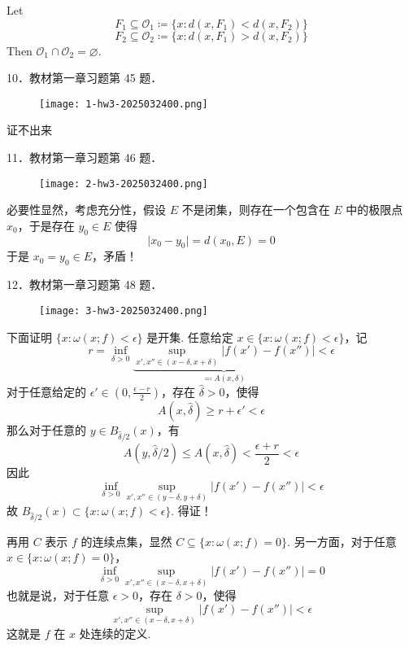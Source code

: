 Let
\[
F_1\subseteq \mathcal{O}_{1}\coloneqq \{ x:d(x,F_1)<d(x,F_2) \}
\]
\[
F_2\subseteq \mathcal{O}_{2}\coloneqq \{ x:d(x,F_1)>d(x,F_2) \}
\]
Then $\mathcal{O}_{1}\cap \mathcal{O}_{2}=\varnothing$.

\begin{exercise}
10．教材第一章习题第 45 题．
\begin{figure}[H]
\centering
\texttt{[image: 1-hw3-2025032400.png]}
\label{}
\end{figure}
\end{exercise}
证不出来

\begin{exercise}
11．教材第一章习题第 46 题．
\begin{figure}[H]
\centering
\texttt{[image: 2-hw3-2025032400.png]}
\label{}
\end{figure}
\end{exercise}
必要性显然，考虑充分性，假设 $E$ 不是闭集，则存在一个包含在 $E$ 中的极限点 $x_0$，于是存在 $y_0\in E$ 使得
\[
\lvert x_0-y_0 \rvert =d(x_0,E)=0
\]
于是 $x_0=y_0\in E$，矛盾！

\begin{exercise}
12．教材第一章习题第 48 题．
\begin{figure}[H]
\centering
\texttt{[image: 3-hw3-2025032400.png]}
\label{}
\end{figure}
\end{exercise}
下面证明 $\{ x:\omega(x;f)<\epsilon \}$ 是开集. 任意给定 $x\in \{x: \omega(x;f)<\epsilon \}$，记
\[
r=\inf_{\delta>0}\underbrace{ \sup_{x',x''\in(x-\delta,x+\delta)} \lvert f(x')-f(x'') \rvert }_{ \eqqcolon A(x,\delta) } <\epsilon
\]
对于任意给定的 $\epsilon'\in\left( 0,\frac{\epsilon-r}{2} \right)$，存在 $\widehat{\delta}>0$，使得
\[
A(x,\widehat{\delta})\geq r+\epsilon'<\epsilon
\]
那么对于任意的 $y\in B_{\widehat{\delta}/2 }(x)$，有
\[
A\left( y,\widehat{\delta}/2 \right)\leq A(x,\widehat{\delta})<\frac{\epsilon+r}{2}<\epsilon
\]
因此
\[
\inf_{\delta>0}\sup_{x',x''\in(y-\delta,y+\delta)}\lvert f(x')-f(x'') \rvert <\epsilon
\]
故 $B_{\widehat{\delta}/2}(x)\subset \{ x:\omega(x;f)<\epsilon \}$. 得证！

再用 $C$ 表示 $f$ 的连续点集，显然 $C\subseteq \{ x:\omega(x;f)=0 \}$. 另一方面，对于任意 $x\in \{ x:\omega(x;f)=0 \}$，
\[
\inf_{\delta>0}\sup_{x',x''\in(x-\delta,x+\delta)}\lvert f(x')-f(x'') \rvert =0
\]
也就是说，对于任意 $\epsilon>0$，存在 $\delta>0$，使得
\[
\sup_{x',x''\in(x-\delta,x+\delta)}\lvert f(x')-f(x'') \rvert  <\epsilon
\]
这就是 $f$ 在 $x$ 处连续的定义.
